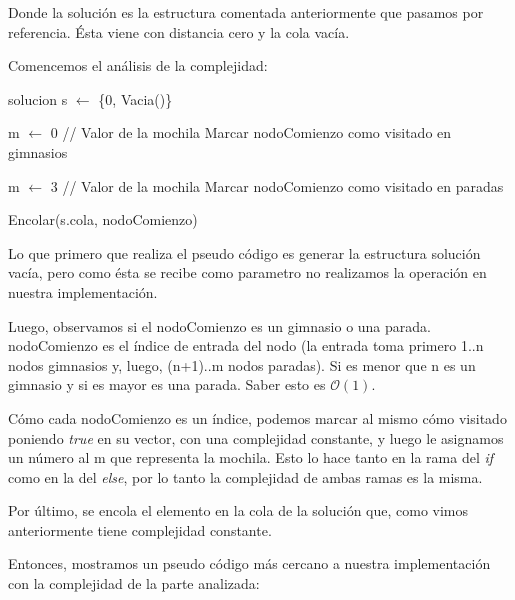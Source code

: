 Donde la solución es la estructura comentada anteriormente que pasamos por referencia. Ésta viene con distancia cero y la cola vacía.

Comencemos el análisis de la complejidad:

\begin{algorithm}[H]
\label{}
\begin{algorithmic}[]

\State solucion s $\leftarrow$ \{0, Vacia()\}


	\State m $\leftarrow$ 0  // Valor de la mochila
	\State Marcar nodoComienzo como visitado en gimnasios

\Else

	\State m $\leftarrow$ 3  // Valor de la mochila
	\State Marcar nodoComienzo como visitado en paradas

\EndIf

\State Encolar(s.cola, nodoComienzo)

\medskip
\Statex \underline{}
\end{algorithmic}
\end{algorithm}


Lo que primero que realiza el pseudo código es generar la estructura solución vacía, pero como ésta se recibe como parametro no realizamos la operación en nuestra implementación.

Luego, observamos si el nodoComienzo es un gimnasio o una parada. nodoComienzo es el índice de entrada del nodo (la entrada toma primero 1..n nodos gimnasios y, luego, (n+1)..m nodos paradas). Si es menor que n es un gimnasio y si es mayor es una parada. Saber esto es $\mathcal{O}(1)$.

Cómo cada nodoComienzo es un índice, podemos marcar al mismo cómo visitado poniendo \textit{true} en su vector, con una complejidad constante, y luego le asignamos un número al m que representa la mochila. Esto lo hace tanto en la rama del \textit{if} como en la del \textit{else}, por lo tanto la complejidad de ambas ramas es la misma.

Por último, se encola el elemento en la cola de la solución que, como vimos anteriormente tiene complejidad constante.

Entonces, mostramos un pseudo código más cercano a nuestra implementación con la complejidad de la parte analizada:

